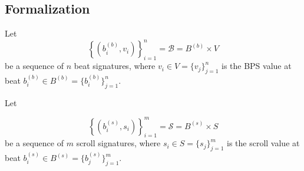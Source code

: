 \documentclass[a4paper,9pt]{article}
\begin{document}
    \subsection{Formalization}

    Let
    \begin{equation}
	    \left\{\left( b_{i}^{(b)},v_{i} \right)\right\}_{i=1}^{n} = \mathcal{B} = B^{(b)} \times V
	    \label{eq:B}
    \end{equation}
    be a sequence of $n$ beat signatures, where $v_i \in V = \{v_j\}_{j=1}^{n}$ is the BPS value at beat $b_i^{(b)} \in B^{(b)} = \{b_i^{(b)}\}_{j=1}^{n}$.

    Let

    \begin{equation}
	    \left\{ \left( b_{i}^{(s)},s_{i} \right) \right\} _{i=1}^{m} = \mathcal{S} = B^{(s)} \times S
	    \label{eq:S}
    \end{equation}
    be a sequence of $m$ scroll signatures, where $s_i \in S = \{s_j\}_{j=1}^{m}$ is the scroll value at beat $b_i^{(s)} \in B^{(s)}= \{b_j^{(s)}\}_{j=1}^{m}$.
\end{document}
